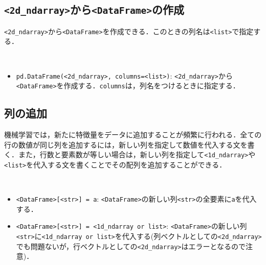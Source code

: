 \subsection{\texttt{<2d\_ndarray>}から\texttt{<DataFrame>}の作成}

\texttt{<2d\_ndarray>}から\texttt{<DataFrame>}を作成できる．このときの列名は\texttt{<list>}で指定する．

\begin{gram}　
\begin{itemize}
\item \texttt{pd.DataFrame(<2d\_ndarray>, columns=<list>)}: \texttt{<2d\_ndarray>}から\texttt{<DataFrame>}を作成する．\texttt{columns}は，列名をつけるときに指定する．
\end{itemize}
\end{gram}
\begin{cod}[\texttt{pd6.py}]　
}]{code/pd6.py}
\vspace{-10pt}
\begin{lstlisting}
df=
   col1  col2  col3
0     1     2     3
1     4     5     6
2     7     8     9
3    10    11    12
\end{lstlisting}
\end{cod}
\vspace{-10pt}

\subsection{列の追加}

機械学習では，新たに特徴量をデータに追加することが頻繁に行われる．全ての行の数値が同じ列を追加するには，新しい列を指定して数値を代入する文を書く．また，行数と要素数が等しい場合は，新しい列を指定して\texttt{<1d\_ndarray>}や\texttt{<list>}を代入する文を書くことでその配列を追加することができる．

\begin{gram}　
\begin{itemize}
\item \texttt{<DataFrame>[<str>] = a}: \texttt{<DataFrame>}の新しい列\texttt{<str>}の全要素に\texttt{a}を代入する．
\item \texttt{<DataFrame>[<str>] = <1d\_ndarray or list>}: \texttt{<DataFrame>}の新しい列\texttt{<str>}に\texttt{<1d\_ndarray or list>}を代入する(列ベクトルとしての\texttt{<2d\_ndarray>}でも問題ないが，行ベクトルとしての\texttt{<2d\_ndarray>}はエラーとなるので注意)．
\end{itemize}
\end{gram}
\begin{cod}[\texttt{pd3.py}]　
}]{code/pd3.py}
\vspace{-10pt}
\begin{lstlisting}
df=
   population   profit  all_1  ndarray  list
0      6.1101  17.5920      1        0     0
1      5.5277   9.1302      1        1     1
2      8.5186  13.6620      1        2     2
3      7.0032  11.8540      1        3     3
4      5.8598   6.8233      1        4     4
\end{lstlisting}
\end{cod}
\vspace{-10pt}

